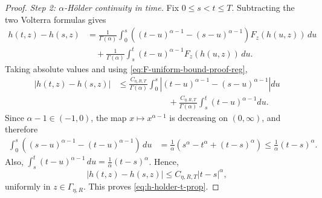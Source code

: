 \documentclass[letterpaper]{article}
\numberwithin{equation}{section}
\theoremstyle{definition}
\theoremstyle{remark}
\begin{document}
\begin{proof}
\medskip
\noindent
\textit{Step 2: $\alpha$-H\"older continuity in time.}
Fix $0\le s<t\le T$. Subtracting the two Volterra formulas gives
\begin{align*}
  h(t,z)-h(s,z)
  &=
  \frac{1}{\Gamma(\alpha)}
  \int_0^s
  \left((t-u)^{\alpha-1}-(s-u)^{\alpha-1}\right)F_z(h(u,z))\,du\\
  &\quad
  +
  \frac{1}{\Gamma(\alpha)}
  \int_s^t (t-u)^{\alpha-1}F_z(h(u,z))\,du.
\end{align*}
Taking absolute values and using \eqref{eq:F-uniform-bound-proof-reg},
\begin{align*}
  |h(t,z)-h(s,z)|
  &\le
  \frac{C_{\eta,R,T}}{\Gamma(\alpha)}
  \int_0^s
  \left|(t-u)^{\alpha-1}-(s-u)^{\alpha-1}\right|du
  \\
  &\qquad\qquad\qquad
  +
  \frac{C_{\eta,R,T}}{\Gamma(\alpha)}
  \int_s^t (t-u)^{\alpha-1}du.
\end{align*}
Since $\alpha-1\in(-1,0)$, the map $x\mapsto x^{\alpha-1}$ is decreasing on
$(0,\infty)$, and therefore
\begin{align*}
  \int_0^s\left((s-u)^{\alpha-1}-(t-u)^{\alpha-1}\right)\,du
  &=
  \frac{1}{\alpha}\left(s^\alpha-t^\alpha+(t-s)^\alpha\right)
  \le \frac{1}{\alpha}(t-s)^\alpha.
\end{align*}
Also,
$\int_s^t (t-u)^{\alpha-1}\,du=\frac1\alpha (t-s)^\alpha$.
Hence,
\[
  |h(t,z)-h(s,z)|
  \le C_{\eta,R,T}|t-s|^\alpha,
\]
uniformly in $z\in\Gamma_{\eta,R}$. This proves \eqref{eq:h-holder-t-prop}.


\end{proof}
\end{document}
